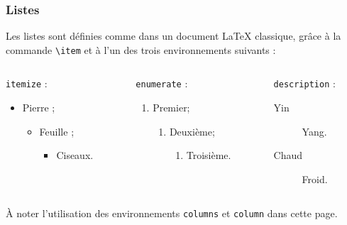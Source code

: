 \documentclass[10pt,    %
    french,             %
    xcolor=table,       %
    envcountsect        %
]{beamer}
\begin{document}
\begin{frame}
    \frametitle{Listes}
    
    Les listes sont définies comme dans un document \LaTeX{} classique, grâce à la commande \texttt{\textbackslash{}item} et à l'un des trois environnements suivants :
    \begin{columns}[T,onlytextwidth]
        \begin{column}{0.33\textwidth}
            \texttt{itemize} :
            \begin{itemize}
                \item Pierre ;
                \begin{itemize}
                    \item Feuille ;
                    \begin{itemize}
                        \item Ciseaux.
                    \end{itemize}
                \end{itemize}
            \end{itemize}
        \end{column}
        \begin{column}{0.33\textwidth}
            \texttt{enumerate} :
            \begin{enumerate}
                \item Premier;
                \begin{enumerate}
                    \item Deuxième;
                    \begin{enumerate}
                        \item Troisième.
                    \end{enumerate}
                \end{enumerate}
            \end{enumerate}
        \end{column}
        \begin{column}{0.33\textwidth}
            \texttt{description} :
            \begin{description}
                \item[Yin] Yang.
                \item[Chaud] Froid.
            \end{description}
        \end{column}
    \end{columns}
    
    \vspace{0.25cm}
    À noter l'utilisation des environnements \texttt{columns} et \texttt{column} dans cette page.
\end{frame}
\end{document}
